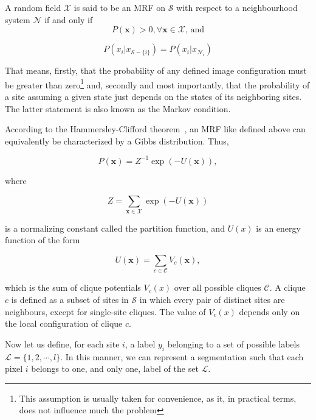 A random field $\mathcal X$ is said to be an MRF on $\mathcal S$ with respect to a neighbourhood system $\mathcal N$ if and only if
\begin{equation}
P({\mathbf x})>0, \forall \mathbf x \in \mathcal X \textrm{, and}
\end{equation}

\begin{equation}
P(x_i\vert x_{{\mathcal S}-\{i\}})=P(x_i\vert x_{{\mathcal N}_i}) 
\end{equation}

That means, firstly, that the probability of any defined image configuration must be greater than zero\footnote{This assumption is usually taken for convenience, as it, in practical terms, does not influence much the problem} and, secondly and most importantly, that the probability of a site assuming a given state just depends on the states of its neighboring sites. The latter statement is also known as the Markov condition.

According to the Hammersley-Clifford theorem~\cite{besag:clifford_theorem}, an MRF like defined above can equivalently be characterized by a Gibbs distribution. Thus,

\begin{equation}P({\mathbf x})=Z^{-1}\exp(-U(\mathbf x)), 
\end{equation}

where

\begin{equation}Z=\sum_{{\mathbf x} \in \mathcal X}\exp(-U({\mathbf x}))
\end{equation}

is a normalizing constant called the partition function, and $U(x)$ is an energy function of the form

\begin{equation} \label{energy_u} 
U({\mathbf x})=\sum_{c \in \mathcal C}V_c({\mathbf x}),  
\end{equation}

which is the sum of clique potentials $V_c(x)$ over all possible cliques $\mathcal C$. A clique $c$ is defined as a subset of sites in $\mathcal S$ in which every pair of distinct sites are neighbours, except for single-site cliques. The value of $V_c(x)$ depends only on the local configuration of clique $c$.

Now let us define, for each site $i$, a label $y_i$ belonging to a set of possible labels ${\mathcal L}=\{1, 2, \cdots, l\}$. In this manner, we can represent a segmentation such that each pixel $i$ belongs to one, and only one, label of the set $\mathcal L$.


